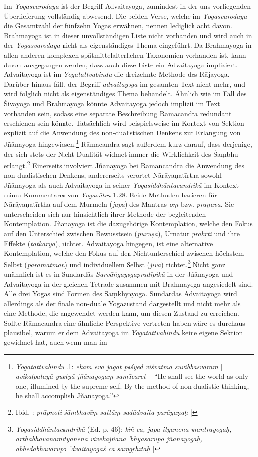 Im \textit{Yogasvarodaya} ist der Begriff Advaitayoga, zumindest in der uns vorliegenden Überlieferung vollständig abwesend. Die beiden Verse, welche im \textit{Yogasvarodaya} die Gesamtzahl der fünfzehn Yogas erwähnen, nennen lediglich acht davon. Brahmayoga ist in dieser unvollständigen Liste nicht vorhanden und wird auch in der \textit{Yogasvarodaya} nicht als eigenständiges Thema eingeführt. Da Brahmayoga in allen anderen komplexen spätmittelalterlichen Taxonomien vorhanden ist, kann davon ausgegangen werden, dass auch diese Liste ein Advaitayoga impliziert.  
Advaitayoga ist im \textit{Yogatattvabindu} die dreizehnte Methode des Rājayoga. Darüber hinaus fällt der Begriff \textit{advaitayoga} im gesamten Text nicht mehr, und wird folglich nicht als eigenständiges Thema behandelt. Ähnlich wie im Fall des Śivayoga und Brahmayoga könnte Advaitayoga jedoch implizit im Text vorhanden sein, sodass eine separate Beschreibung Rāmacandra redundant erschienen sein könnte. Tatsächlich wird beispielsweise im Kontext von Sektion  explizit auf die Anwendung des non-dualistischen Denkens zur Erlangung von Jñānayoga hingewiesen.\footnote{\textit{Yogatattvabindu} .1: \textit{ekam eva jagat paśyed viśvātmā suvibhāsvaram} | \textit{avikalpatayā yuktyā jñānayogaṃ samācaret} || ``He shall see the world as only one, illumined by the supreme self. By the method of non-dualistic thinking, he shall accomplish Jñānayoga.''} Rāmacandra sagt außerdem kurz darauf, dass derjenige, der sich stets der Nicht-Dualität widmet immer die Wirklichkeit des Śaṃbhu erlangt.\footnote{Ibid. : \textit{prāpnoti śāmbhavīṃ sattāṃ sadādvaita parāyaṇaḥ} |} Einerseits involviert Jñānayoga bei Rāmancandra die Anwendung des non-dualistischen Denkens, andererseits verortet Nārāyaṇatīrtha sowohl Jñānayoga als auch Advaitayoga in seiner \textit{Yogasiddhāntacandrikā} im Kontext seines Kommentares von \textit{Yogasūtra} 1.28. Beide Methoden basieren für Nārāyaṇatīrtha auf dem Murmeln (\textit{japa}) des Mantras \textit{oṃ} bzw. \textit{praṇava}. Sie unterscheiden sich nur hinsichtlich ihrer Methode der begleitenden Kontemplation. Jñānayoga ist die dazugehörige Kontemplation, welche den Fokus auf den Unterschied zwischen Bewusstsein (\textit{puruṣa}), Urnatur \textit{prakṛti} und ihre Effekte (\textit{tatkārya}), richtet. Advaitayoga hingegen, ist eine alternative Kontemplation, welche den Fokus auf den Nichtunterschied zwischen höchstem Selbst (\textit{paramātman}) und individuellem Selbst (\textit{jīva}) richtet.\footnote{\emph{Yogasiddhāntacandrikā} (Ed. p. 46): \textit{kiñ ca, japa ityanena mantrayogaḥ, arthabhāvanamityanena vivekajñānā 'bhyāsarūpo jñānayogaḥ, abhedabhāvarūpo 'dvaitayogaś ca saṃgṛhītaḥ} |} Nicht ganz unähnlich ist es in Sundardās \textit{Sarvāṅgayogapradīpikā} in der Jñānayoga und Advaitayoga in der gleichen Tetrade zusammen mit Brahmayoga angesiedelt sind. Alle drei Yogas sind Formen des Sāṃkhyayoga. Sundardās Advaitayoga wird allerdings als der finale non-duale Yogazustand dargestellt und nicht mehr als eine Methode, die angewendet werden kann, um diesen Zustand zu erreichen. Sollte Rāmacandra eine ähnliche Perspektive vertreten haben wäre es durchaus plausibel, warum er dem Advaitayoga im \textit{Yogatattvabindu} keine eigene Sektion gewidmet hat, auch wenn man im 